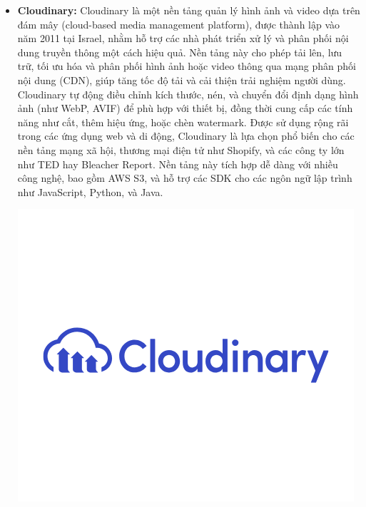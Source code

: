 \begin{itemize}
    \item \textbf{Cloudinary:} Cloudinary là một nền tảng quản lý hình ảnh và video dựa trên đám mây (cloud-based media management platform), được thành lập vào năm 2011 tại Israel, nhằm hỗ trợ các nhà phát triển xử lý và phân phối nội dung truyền thông một cách hiệu quả. Nền tảng này cho phép tải lên, lưu trữ, tối ưu hóa và phân phối hình ảnh hoặc video thông qua mạng phân phối nội dung (CDN), giúp tăng tốc độ tải và cải thiện trải nghiệm người dùng. Cloudinary tự động điều chỉnh kích thước, nén, và chuyển đổi định dạng hình ảnh (như WebP, AVIF) để phù hợp với thiết bị, đồng thời cung cấp các tính năng như cắt, thêm hiệu ứng, hoặc chèn watermark. Được sử dụng rộng rãi trong các ứng dụng web và di động, Cloudinary là lựa chọn phổ biến cho các nền tảng mạng xã hội, thương mại điện tử như Shopify, và các công ty lớn như TED hay Bleacher Report. Nền tảng này tích hợp dễ dàng với nhiều công nghệ, bao gồm AWS S3, và hỗ trợ các SDK cho các ngôn ngữ lập trình như JavaScript, Python, và Java.

    \includegraphics[width=\textwidth]{img/cloudinary.png}
\end{itemize}

